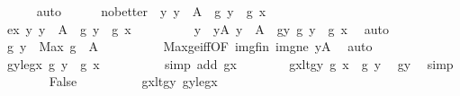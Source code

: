 \begin{isabellebody}
\ \ \ \ \isamarkupfalse%
\ auto\isanewline
\isanewline
\ \ \ \ \isamarkupfalse%
\ no{\isacharunderscore}{\kern0pt}better{\isacharcolon}{\kern0pt}\ {\isachardoublequoteopen}{\isasymnot}\ {\isacharparenleft}{\kern0pt}{\isasymexists}y{\isachardot}{\kern0pt}\ y\ {\isasymin}\ A\ {\isasymand}\ g\ y\ {\isachargreater}{\kern0pt}\ g\ x{\isacharparenright}{\kern0pt}{\isachardoublequoteclose}\isanewline
\ \ \ \ \isamarkupfalse%
\isanewline
\ \ \ \ \ \ \isamarkupfalse%
\ ex{\isacharcolon}{\kern0pt}\ {\isachardoublequoteopen}{\isasymexists}y{\isachardot}{\kern0pt}\ y\ {\isasymin}\ A\ {\isasymand}\ g\ y\ {\isachargreater}{\kern0pt}\ g\ x{\isachardoublequoteclose}\isanewline
\ \ \ \ \ \ \isamarkupfalse%
\ \isamarkupfalse%
\ y\ \ yA{\isacharcolon}{\kern0pt}\ {\isachardoublequoteopen}y\ {\isasymin}\ A{\isachardoublequoteclose}\ \ gy{\isacharcolon}{\kern0pt}\ {\isachardoublequoteopen}g\ y\ {\isachargreater}{\kern0pt}\ g\ x{\isachardoublequoteclose}\ \isamarkupfalse%
\ auto\isanewline
\isanewline
\ \ \ \ \ \ \isamarkupfalse%
\ {\isachardoublequoteopen}g\ y\ {\isasymle}\ Max\ {\isacharparenleft}{\kern0pt}g\ {\isacharbackquote}{\kern0pt}\ A{\isacharparenright}{\kern0pt}{\isachardoublequoteclose}\isanewline
\ \ \ \ \ \ \ \ \isamarkupfalse%
\ Max{\isacharunderscore}{\kern0pt}ge{\isacharunderscore}{\kern0pt}iff{\isacharbrackleft}{\kern0pt}OF\ img{\isacharunderscore}{\kern0pt}fin\ img{\isacharunderscore}{\kern0pt}ne{\isacharbrackright}{\kern0pt}\ yA\ \isamarkupfalse%
\ auto\isanewline
\ \ \ \ \ \ \isamarkupfalse%
\ gy{\isacharunderscore}{\kern0pt}le{\isacharunderscore}{\kern0pt}gx{\isacharcolon}{\kern0pt}\ {\isachardoublequoteopen}g\ y\ {\isasymle}\ g\ x{\isachardoublequoteclose}\isanewline
\ \ \ \ \ \ \ \ \isamarkupfalse%
\ {\isacharparenleft}{\kern0pt}simp\ add{\isacharcolon}{\kern0pt}\ gx{\isacharparenright}{\kern0pt}\isanewline
\isanewline
\ \ \ \ \ \ \isamarkupfalse%
\ gx{\isacharunderscore}{\kern0pt}lt{\isacharunderscore}{\kern0pt}gy{\isacharcolon}{\kern0pt}\ {\isachardoublequoteopen}g\ x\ {\isacharless}{\kern0pt}\ g\ y{\isachardoublequoteclose}\ \isamarkupfalse%
\ gy\ \isamarkupfalse%
\ simp\isanewline
\ \ \ \ \ \ \isamarkupfalse%
\ False\isanewline
\ \ \ \ \ \ \ \ \isamarkupfalse%
\ gx{\isacharunderscore}{\kern0pt}lt{\isacharunderscore}{\kern0pt}gy\ gy{\isacharunderscore}{\kern0pt}le{\isacharunderscore}{\kern0pt}gx\ \isamarkupfalse%

\end{isabellebody}
